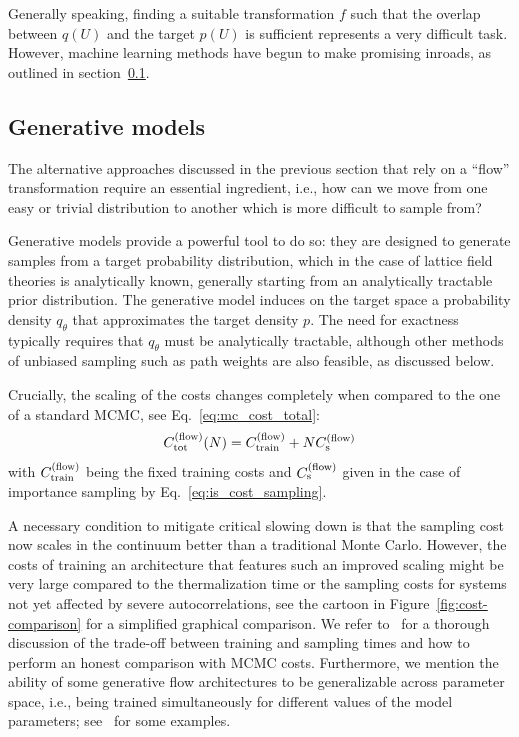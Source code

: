 \documentclass[12pt]{article}
\begin{document}
Generally speaking, finding a suitable transformation $f$ such that the overlap between $q(U)$ and the target $p(U)$ is sufficient represents a very difficult task. However, machine learning methods have begun to make promising inroads, as outlined in section~\ref{sec:gen_models}.

\subsection{Generative models}
\label{sec:gen_models}

The alternative approaches discussed in the previous section that rely on a ``flow'' transformation require an essential ingredient, i.e., how can we move from one easy or trivial distribution to another which is more difficult to sample from?

Generative models provide a powerful tool to do so: they are designed to generate samples from a target probability distribution, which in the case of lattice field theories is analytically known, generally starting from an analytically tractable prior distribution. The generative model induces on the target space a probability density $q_\theta$ that approximates the target density $p$. The need for exactness typically requires that  $q_\theta$ must be analytically tractable, although other methods of unbiased sampling such as path weights are also feasible, as discussed below.

Crucially, the scaling of the costs changes completely when compared to the one of a standard MCMC, see Eq.~\eqref{eq:mc_cost_total}:
\begin{equation}
 C^{(\rm flow)}_{\rm tot} (N) = C^{(\rm flow)}_{\rm train} + N C^{(\rm flow)}_{\rm s}
\end{equation}
with $C^{(\rm flow)}_{\rm train}$ being the fixed training costs and $C^{(\rm flow)}_{\rm s}$ given in the case of importance sampling by Eq.~\eqref{eq:is_cost_sampling}.

A necessary condition to mitigate critical slowing down is that the sampling cost now scales in the continuum better than a traditional Monte Carlo. However, the costs of training an architecture that features such an improved scaling might be very large compared to the thermalization time or the sampling costs for systems not yet affected by severe autocorrelations, see the cartoon in Figure~\ref{fig:cost-comparison} for a simplified graphical comparison. 
We refer to~\cite{Abbott:2022zsh} for a thorough discussion of the trade-off between training and sampling times and how to perform an honest comparison with MCMC costs. Furthermore, we mention the ability of some generative flow architectures to be generalizable across parameter space, i.e., being trained simultaneously for different values of the model parameters; see~\cite{dibak2022temperature,Gerdes:2022eve,Singha:2022icw,Zhu:2025pmw} for some examples.
\end{document}
